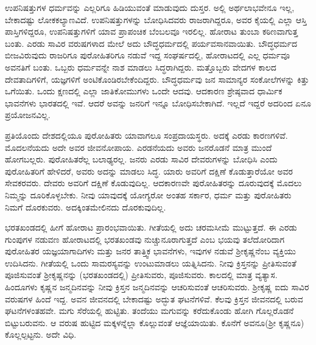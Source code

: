 ಉಪನಿಷತ್ತುಗಳ ಧರ್ಮವನ್ನು ಎಲ್ಲರಿಗೂ ಹಿಡಿಯುವಂತೆ ಮಾಡುವುದು ದುಸ್ತರ. ಅಲ್ಲಿ ಅರ್ಥಲಾಭವೇನೂ ಇಲ್ಲ, ಬೇಕಾದಷ್ಟು ಲೋಕಕಲ್ಯಾಣವಿದೆ. ಉಪನಿಷತ್ತುಗಳನ್ನು ಬೋಧಿಸಿದವರು ರಾಜರಾಗಿದ್ದರೂ, ಅವರ ಕೈಯಲ್ಲಿ ಎಲ್ಲಾ ಆಸ್ತಿ ಪಾಸ್ತಿಗಳಿದ್ದರೂ, ಉಪನಿಷತ್ತುಗಳಿಗೆ ಯಾವ ಪ್ರಾಪಂಚಿಕ ಬೆಂಬಲವೂ ಇರಲಿಲ್ಲ. ಹೋರಾಟ ತುಂಬಾ ಕಠಿಣವಾಗುತ್ತ ಬಂತು. ಎರಡು ಸಾವಿರ ವರುಷಗಳಾದ ಮೇಲೆ ಅದು ಬೌದ್ಧಧರ್ಮದಲ್ಲಿ ಪರ್ಯವಸಾನವಾಯಿತು. ಬೌದ್ಧಧರ್ಮದ ಬೀಜವಿರುವುದು ರಾಜರಿಗೂ ಪುರೋಹಿತರಿಗೂ ನಡುವೆ ಇದ್ದ ಸಂಘರ್ಷದಲ್ಲಿ, ಹೋರಾಟದಲ್ಲಿ ಎಲ್ಲ ಧರ್ಮವೂ ಅವನತಿಗೆ ಬಂತು. ಒಬ್ಬರು ಧರ್ಮವನ್ನೇ ನಾಶ ಮಾಡಲು ಸಿದ್ಧರಾಗಿದ್ದರು. ಮತ್ತೊಬ್ಬರು ವೇದಗಳ ಕಾಲದ ದೇವತಾದಿಗಳಿಗೆ, ಯಜ್ಞಗಳಿಗೆ ಅಂಟಿಕೊಂಡಿರಬೇಕೆಂದಿದ್ದರು. ಬೌದ್ಧಧರ್ಮವು ಜನ ಸಾಮಾನ್ಯರ ಸಂಕೋಲೆಗಳನ್ನು ಕಿತ್ತು ಒಗೆಯಿತು. ಒಂದು ಕ್ಷಣದಲ್ಲಿ ಎಲ್ಲಾ ಜಾತಿಕೋಮುಗಳು ಒಂದೇ ಆದವು. ಆದಕಾರಣ ಶ್ರೇಷ್ಠವಾದ ಧಾರ್ಮಿಕ ಭಾವನೆಗಳು ಭಾರತದಲ್ಲಿ ಇವೆ. ಆದರೆ ಅವನ್ನು ಜನರಿಗೆ ಇನ್ನೂ ಬೋಧಿಸಬೇಕಾಗಿದೆ. ಇಲ್ಲದೆ ಇದ್ದರೆ ಅದರಿಂದ ಏನೂ ಪ್ರಯೋಜನವಿಲ್ಲ.

ಪ್ರತಿಯೊಂದು ದೇಶದಲ್ಲಿಯೂ ಪುರೋಹಿತರು ಯಾವಾಗಲೂ ಸಂಪ್ರದಾಯಸ್ಥರು. ಅದಕ್ಕೆ ಎರಡು ಕಾರಣಗಳಿವೆ. ಮೊದಲನೆಯದು ಅದೇ ಅವರ ಜೀವನೋಪಾಯ. ಎರಡನೆಯದು ಅವರು ಜನರೊಡನೆ ಮಾತ್ರ ಮುಂದೆ ಹೋಗಬಲ್ಲರು. ಪುರೋಹಿತರೆಲ್ಲ ಬಲಾಢ್ಯರಲ್ಲ. ಜನರು ಎರಡು ಸಾವಿರ ದೇವರುಗಳನ್ನು ಬೋಧಿಸಿ ಎಂದು ಪುರೋಹಿತರಿಗೆ ಹೇಳಿದರೆ, ಅವರು ಅದನ್ನು ಮಾಡಲು ಸಿದ್ಧ. ಯಾರು ಅವರಿಗೆ ದಕ್ಷಿಣೆ ಕೊಡುತ್ತಾರೆಯೋ ಅವರ ಸೇವಕರವರು. ದೇವರು ಅವರಿಗೆ ದಕ್ಷಿಣೆ ಕೊಡುವುದಿಲ್ಲ. ಆದಕಾರಣವೇ ಪುರೋಹಿತರನ್ನು ದೂರುವುದಕ್ಕೆ ಮೊದಲು ನಿಮ್ಮನ್ನು ದೂರಿಕೊಳ್ಳಬೇಕು. ನೀವು ಯಾವುದಕ್ಕೆ ಯೋಗ್ಯರೋ ಅಂತಹ ಸರ್ಕಾರ, ಧರ್ಮ ಮತ್ತು ಪುರೋಹಿತರು ನಿಮಗೆ ದೊರಕುವರು. ಅದಕ್ಕಿಂತ\break ಮೇಲಿನದು ದೊರಕುವುದಿಲ್ಲ.

ಭರತಖಂಡದಲ್ಲಿ ಹೀಗೆ ಹೋರಾಟ ಪ್ರಾರಂಭವಾಯಿತು. ಗೀತೆಯಲ್ಲಿ ಅದು ಚರಮಸೀಮೆ ಮುಟ್ಟುತ್ತದೆ. ಈ ಎರಡು ಗುಂಪುಗಳ ನಡುವಣ ಹೋರಾಟದಲ್ಲಿ ಭರತಖಂಡವು ನುಚ್ಚುನೂರಾಗುತ್ತದೆ ಎಂಬ ಭಯವು ತಲೆದೋರಿದಾಗ ಪುರೋಹಿತರ ಯಜ್ಞಯಾಗಾದಿಗಳು ಮತ್ತು ಜನರ ತಾತ್ತ್ವಿಕ ಭಾವನೆಗಳು, ಇವುಗಳ ನಡುವೆ ಶ‍್ರೀಕೃಷ್ಣನೆಂಬ ವ್ಯಕ್ತಿಯು ಉದಿಸಿದನು. ಗೀತೆಯಲ್ಲಿ ಒಂದು ಸಾಮರಸ್ಯವನ್ನು ಉಂಟುಮಾಡಲು ಯತ್ನಿಸಿದನು. ನೀವು ಕ್ರಿಸ್ತನನ್ನು ಪ್ರೀತಿಸುವಂತೆ ಪೂಜಿಸುವಂತೆ ಶ‍್ರೀಕೃಷ್ಣನನ್ನು (ಭರತಖಂಡದಲ್ಲಿ) ಪ್ರೀತಿಸು\-ವರು, ಪೂಜಿಸುವರು. ಕಾಲದಲ್ಲಿ ಮಾತ್ರ ವ್ಯತ್ಯಾಸ. ಹಿಂದೂಗಳು ಕೃಷ್ಣನ ಜನ್ಮದಿನವನ್ನು ನೀವು ಕ್ರಿಸ್ತನ ಜನ್ಮದಿನವನ್ನು ಆಚರಿಸುವಂತೆ ಆಚರಿಸುವರು. ಶ‍್ರೀಕೃಷ್ಣ ಐದು ಸಾವಿರ ವರುಷಗಳ ಹಿಂದೆ ಇದ್ದ. ಅವನ ಜೀವನದಲ್ಲಿ ಬೇಕಾದಷ್ಟು ಅದ್ಭುತ ಘಟನೆಗಳಿವೆ. ಕೆಲವು ಕ್ರಿಸ್ತನ ಜೀವನದಲ್ಲಿ ಬರುವ ಘಟನೆಗಳಂತಹವೇ. ಮಗು ಸೆರೆಯಲ್ಲಿ ಹುಟ್ಟಿತು. ತಂದೆಯು ಮಗುವನ್ನು ಕರೆದುಕೊಂಡು ಹೋಗಿ ಗೊಲ್ಲರೊಡನೆ ಬಿಟ್ಟುಬರುವನು. ಆ ವರುಷ ಹುಟ್ಟಿದ ಮಕ್ಕಳನ್ನೆಲ್ಲಾ ಕೊಲ್ಲುವಂತೆ ಆಜ್ಞೆಯಾಯಿತು. ಕೊನೆಗೆ ಅವನೂ\break (ಶ‍್ರೀ ಕೃಷ್ಣನೂ) ಕೊಲ್ಲಲ್ಪಟ್ಟನು. ಅದೇ ವಿಧಿ.

